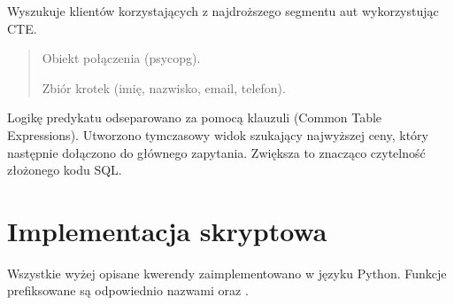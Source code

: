 \documentclass[a4paper,11pt,english,openany,oneside]{sphinxmanual}
\begin{document}
\begin{savenotes}\begin{fulllineitems}

\pysigstartsignatures
\pysiglinewithargsret
{}
{}
{}
\pysigstopsignatures
\sphinxAtStartPar
Wyszukuje klientów korzystających z najdroższego segmentu aut wykorzystując CTE.
\begin{quote}\begin{description}
\sphinxAtStartPar
{} \textendash{} Obiekt połączenia (psycopg).

\sphinxAtStartPar
Zbiór krotek (imię, nazwisko, email, telefon).

\end{description}\end{quote}

\sphinxAtStartPar
{} Logikę predykatu odseparowano za pomocą klauzuli  (Common Table Expressions). Utworzono tymczasowy widok szukający najwyższej ceny, który następnie dołączono do głównego zapytania. Zwiększa to znacząco czytelność złożonego kodu SQL.

\end{fulllineitems}\end{savenotes}



\section{Implementacja skryptowa}
\label{\detokenize{rozdzial_5/index:implementacja-skryptowa}}
\sphinxAtStartPar
Wszystkie wyżej opisane kwerendy zaimplementowano w języku Python. Funkcje prefiksowane są odpowiednio nazwami  oraz .
\end{document}

